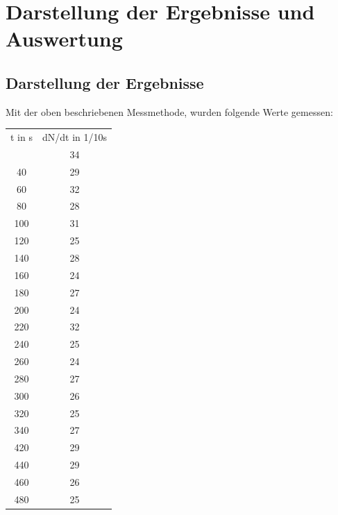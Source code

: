\section{Darstellung der Ergebnisse und Auswertung}

\subsection{Darstellung der Ergebnisse}
Mit der oben beschriebenen Messmethode, wurden folgende Werte gemessen:
\begin{table}

\begin{tabular}{c|c}
t in s & dN/dt in 1/10s \\ 
\Hline
20	&34\\ 

40	&29\\ 

60	&32\\ 

80	&28\\ 

100	&31\\ 

120	&25\\ 

140	&28\\ 

160	&24\\ 

180	&27\\ 

200	&24\\ 

220	&32\\ 

240	&25\\ 

260	&24\\ 

280	&27\\ 
	
300	&26\\ 

320	&25\\ 

340	&27\\ 

420	&29\\ 
	
440	&29\\ 

460	&26\\ 

480	&25\\ 


\end{tabular}
\end{table}
